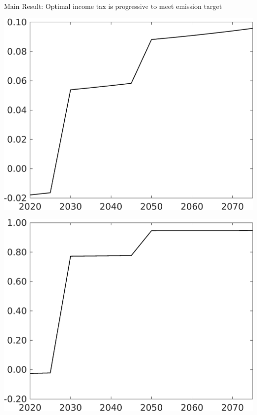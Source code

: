 \documentclass[11pt,aspectratio=169]{beamer}
\begin{document}
\begin{frame}{Main Result: Optimal income tax is progressive to meet emission target}
\begin{minipage}[]{0.32\textwidth}
	\includegraphics[width=1\textwidth]{../codding_model/own_basedOnFried/optimalPol_elastS_DisuSci/figures/all_1705/Single_OPT_T_NoTaus_taul_spillover0_sep1_BN1_ineq0_red0_etaa0.79.png}
\end{minipage}
\begin{minipage}[]{0.32\textwidth}
	\includegraphics[width=1\textwidth]{../codding_model/own_basedOnFried/optimalPol_elastS_DisuSci/figures/all_1705/Single_OPT_T_NoTaus_tauf_spillover0_sep1_BN1_ineq0_red0_etaa0.79.png}
\end{minipage}
\end{frame}
\end{document}
